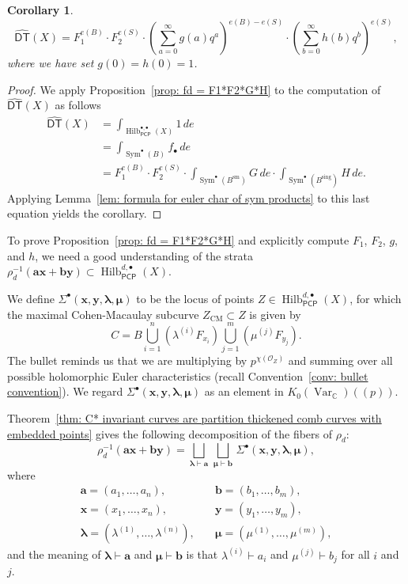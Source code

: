 \documentclass[12pt]{amsart}
\newtheorem{corollary}[theorem]{Corollary}
\theoremstyle{definition}
\newcommand{\CC} {\mathbb{C}}          %
\renewcommand{\O}{\mathcal{O}}
\newcommand{\Sym}{\operatorname{Sym}}
\newcommand{\Hilb}{\operatorname{Hilb}}
\newcommand{\DT}{\mathsf{DT}}
\newcommand{\CM}{\operatorname{CM}}
\newcommand{\Var}{\operatorname{Var}}
\newcommand{\sm}{\operatorname{sm}}
\newcommand{\sing}{\operatorname{sing}}
\newcommand{\boldx}{\boldsymbol{x}}
\newcommand{\boldy}{\boldsymbol{y}}
\newcommand{\bolda}{\boldsymbol{a}}
\newcommand{\boldb}{\boldsymbol{b}}
\newcommand{\boldlambda}{\boldsymbol{\lambda }}
\newcommand{\boldmu}{\boldsymbol{\mu }}
\newcommand{\Sigmaxylambdamu}{\Sigma^{\bullet }(\boldx ,\boldy ,\boldlambda ,\boldmu )}
\newcommand{\DThat}{\widehat{\DT}}
\newcommand{\PCP}{\mathsf{PCP}}
\begin{document}
\begin{corollary}\label{cor: DThat = F1^{e(B)}F2^{e(S)}(sum g q^{a})^{e(B)-e(S)}...}
\[
\DThat (X) = F_{1}^{e(B)}\cdot F_{2}^{e(S)}\cdot
\left(\sum_{a=0}^{\infty}g(a) q^{a} \right)^{e(B)-e(S)}\cdot
\left(\sum_{b=0}^{\infty}h(b) q^{b} \right)^{e(S)},
\]
where we have set $g(0)=h(0)=1$.
\end{corollary}
\begin{proof}
We apply Proposition~\ref{prop: fd = F1*F2*G*H} to the computation of
$\DThat (X)$ as follows
\begin{align*}
\DThat (X)&= \int_{\Hilb^{\bullet ,\bullet}_{\PCP}(X)} 1\, de\\
&=\int_{\Sym^{\bullet}(B)}f_{\bullet } \, de \\
&= F_{1}^{e(B)}\cdot F_{2}^{e(S)}\cdot  \int_{\Sym^{\bullet}(B^{\sm})}
G\,de \cdot  \int_{\Sym^{\bullet}(B^{\sing})}
H\,de .
\end{align*}
Applying Lemma~\ref{lem: formula for euler char of sym products} to
this last equation yields the corollary. 
\end{proof}


To prove Proposition~\ref{prop: fd = F1*F2*G*H} and explicitly
compute $F_{1}$, $F_{2}$, $g$, and $h$, we need a good understanding
of the strata $\rho_{d}^{-1} (\bolda \boldx +\boldb \boldy )\subset
\Hilb^{d,\bullet}_{\PCP}(X)$.


We define $\Sigmaxylambdamu $ to be the
locus of points $Z \in \Hilb^{d,\bullet}_{\PCP }(X)$, for which the
maximal Cohen-Macaulay subcurve $Z_{\CM} \subset Z$ is given by
\[
C = B \bigcup_{i=1}^{n}\left(\lambda^{(i)}F_{x_{i}} \right)
\bigcup_{j=1}^{m}\left(\mu^{(j)}F_{y_{j}} \right).
\]
The bullet reminds us that we are multiplying by $p^{\chi (\O_{Z})}$
and summing over all possible holomorphic Euler characteristics
(recall Convention~\ref{conv: bullet convention}). We regard
$\Sigmaxylambdamu$ as an element in $ K_{0}(\Var_{\CC})(\!(p)\!)$.

Theorem~\ref{thm: C* invariant curves are
partition thickened comb curves with embedded points} gives the
following decomposition of the fibers of $\rho_{d}$:
\begin{equation} \label{eqn: components of fibers of rho}
\rho_{d}^{-1}(\bolda \boldx +\boldb \boldy ) = \bigsqcup_{\boldlambda
\vdash \bolda}\, \bigsqcup_{\boldmu \vdash \boldb}\,  \Sigmaxylambdamu,
\end{equation}
where 
\begin{align*}
\bolda =(a_{1},\dotsc ,a_{n}),&\quad \boldb =(b_{1},\dotsc
,b_{m}),\\
\boldx =(x_{1},\dotsc ,x_{n}),&\quad \boldy =(y_{1},\dotsc
,y_{m}),\\
\boldlambda =(\lambda^{(1)},\dotsc ,\lambda^{(n)}),&\quad \boldmu =(\mu^{(1)},\dotsc ,\mu^{(m)}),
\end{align*}
and the meaning of $\boldlambda \vdash \bolda$ and $\boldmu \vdash
\boldb$ is that $\lambda^{(i)}\vdash a_{i}$ and $\mu^{(j)}\vdash
b_{j}$ for all $i$ and $j$. 
\end{document}
